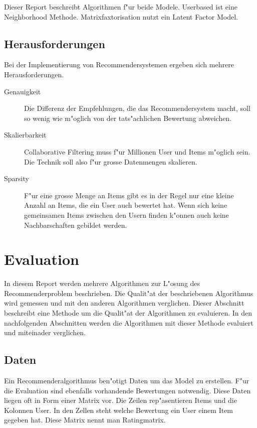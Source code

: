 \documentclass[a4paper, 12pt]{article}
\begin{document}
Dieser Report beschreibt Algorithmen f"ur beide Modele. Userbased ist eine Neighborhood Methode. Matrixfaxtorisation nutzt ein Latent Factor Model.

\subsection{Herausforderungen}
\label{sec:challenges}

Bei der Implementierung von Recommendersystemen ergeben sich mehrere Herausforderungen.

\begin{description}
\item[Genauigkeit] Die Differenz der Empfehlungen, die das Recommendersystem macht, soll so wenig wie m"oglich von der tats"achlichen Bewertung abweichen.
\item[Skalierbarkeit] 
Collaborative Filtering muss f"ur Millionen User und Items m"oglich sein. Die Technik soll also f"ur grosse Datenmengen skalieren.
\item[Sparsity] F"ur eine grosse Menge an Items gibt es in der Regel nur eine kleine Anzahl an Items, die ein User auch bewertet hat. Wenn sich keine gemeinsamen Items zwischen den Usern finden k"onnen auch keine Nachbarschaften gebildet werden.
\end{description}

\section{Evaluation}
\label{sec:evaluation}

In diesem Report werden mehrere Algorithmen zur L"osung des Recommenderproblem beschrieben. Die Qualit"at der beschriebenen Algorithmus wird gemessen und mit den anderen Algorithmen verglichen. Dieser Abschnitt beschreibt eine Methode um die Qualit"at der Algorithmen zu evaluieren. In den nachfolgenden Abschnitten werden die Algorithmen mit dieser Methode evaluiert und miteinader verglichen.

\subsection{Daten}
\label{sec:data}

Ein Recommenderalgorithmus ben"otigt Daten um das Model zu erstellen. F"ur die Evaluation sind ebenfalls vorhandende Bewertungen notwendig. Diese Daten liegen oft in Form einer Matrix vor. Die Zeilen rep"asentieren Items und die Kolonnen User. In den Zellen steht welche Bewertung ein User einem Item gegeben hat. Diese Matrix nennt man Ratingmatrix.
\end{document}
